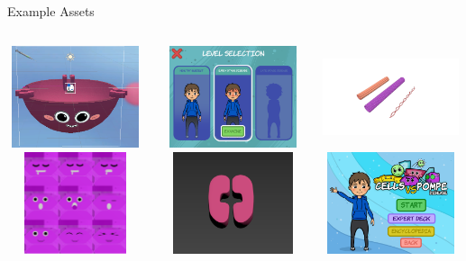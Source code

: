 \documentclass{beamer}
\begin{document}
	\begin{frame}{Example Assets}
		\begin{columns}
			\begin{column}{0.33\textwidth}
				\includegraphics[width=4cm, height=3cm]{asset1.png}
				\includegraphics[width=4cm, height=3cm]{asset2.png}
			\end{column}
			\begin{column}{0.33\textwidth}
				\includegraphics[width=4cm, height=3cm]{asset3.png}
				\includegraphics[width=4cm, height=3cm]{asset4.png}
			\end{column}
			\begin{column}{0.33\textwidth}
				\includegraphics[width=4cm, height=3cm]{asset5.png}
				\includegraphics[width=4cm, height=3cm]{asset6.png}
			\end{column}
		\end{columns}		
	\end{frame}
\end{document}
